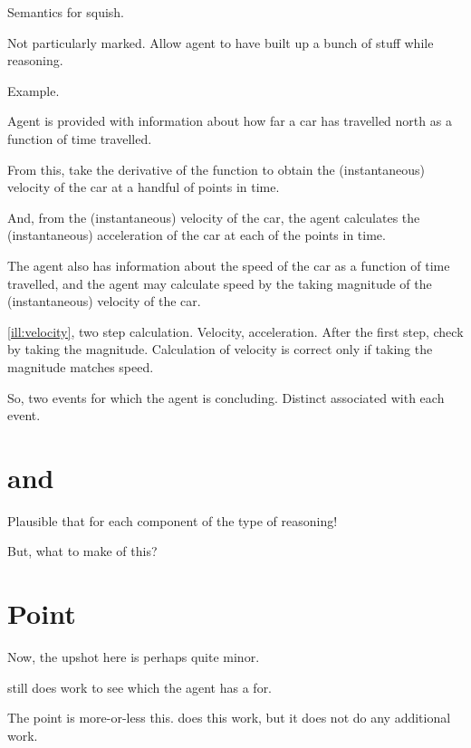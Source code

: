 \begin{note}
  \begin{illustration}
    Semantics for squish.
  \end{illustration}
\end{note}



\begin{note}
  Not particularly marked.
  Allow agent to have built up a bunch of stuff while reasoning.

  Example.

  \begin{illustration}[Velocity]
    \label{ill:velocity}
    Agent is provided with information about how far a car has travelled north as a function of time travelled.

    From this, take the derivative of the function to obtain the (instantaneous) velocity of the car at a handful of points in time.

    And, from the (instantaneous) velocity of the car, the agent calculates the (instantaneous) acceleration of the car at each of the points in time.

    The agent also has information about the speed of the car as a function of time travelled, and the agent may calculate speed by the taking magnitude of the (instantaneous) velocity of the car.
  \end{illustration}

  \autoref{ill:velocity}, two step calculation.
  Velocity, acceleration.
  After the first step, check by taking the magnitude.
  Calculation of velocity is correct only if taking the magnitude matches speed.

  So, two events for which the agent is concluding.
  Distinct  associated with each event.
\end{note}

\section{ and }
\label{sec:sr2}

\begin{note}
  Plausible that \wit{} for each component of the type of reasoning!

  But, what to make of this?
\end{note}

\section{Point}
\label{sec:point}

\begin{note}
  Now, the upshot here is perhaps quite minor.

  \issueConstraint{} still does work to see which \ros{} the agent has a \wit{} for.

  The point is more-or-less this.
  \issueConstraint{} does this work, but it does not do any additional work.
\end{note}

